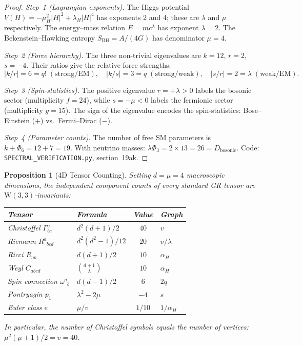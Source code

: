 \documentclass[12pt,a4paper]{article}
\newtheorem{proposition}[theorem]{Proposition}
\newcommand{\W}{\mathrm{W}(3,3)}
\begin{document}
\begin{proof}
\emph{Step~1 (Lagrangian exponents).}
The Higgs potential $V(H) = -\mu_H^2|H|^2 + \lambda_H|H|^4$
has exponents 2 and 4; these are $\lambda$ and $\mu$
respectively. The energy--mass relation $E = mc^\lambda$ has
exponent $\lambda = 2$. The Bekenstein--Hawking entropy
$S_{\mathrm{BH}} = A/(4G)$ has denominator $\mu = 4$.

\emph{Step~2 (Force hierarchy).}
The three non-trivial eigenvalues are $k = 12$, $r = 2$, $s = -4$.
Their ratios give the relative force strengths:
\[
  |k/r| = 6 = q! \;(\text{strong/EM}), \quad
  |k/s| = 3 = q  \;(\text{strong/weak}), \quad
  |s/r| = 2 = \lambda \;(\text{weak/EM}).
\]

\emph{Step~3 (Spin-statistics).}
The positive eigenvalue $r = +\lambda > 0$ labels the bosonic
sector (multiplicity $f = 24$), while $s = -\mu < 0$ labels
the fermionic sector (multiplicity $g = 15$).
The sign of the eigenvalue encodes the spin-statistics:
Bose--Einstein ($+$) vs.\ Fermi--Dirac ($-$).

\emph{Step~4 (Parameter counts).}
The number of free SM parameters is $k + \Phi_6 = 12 + 7 = 19$.
With neutrino masses: $\lambda\Phi_3 = 2 \times 13 = 26 = D_{\mathrm{bosonic}}$.
Code: \texttt{SPECTRAL\_VERIFICATION.py}, section~19ak.
\end{proof}


\begin{proposition}[4D Tensor Counting]\label{prop:tensor-count}
Setting $d = \mu = 4$ macroscopic dimensions, the independent
component counts of every standard GR tensor are $\W$-invariants:
\begin{center}
\begin{tabular}{llcl}
\toprule
\textbf{Tensor} & \textbf{Formula} & \textbf{Value} & \textbf{Graph} \\
\midrule
Christoffel $\Gamma^a_{bc}$ & $d^2(d+1)/2$ & $40$ & $v$ \\
Riemann $R^a_{\phantom{a}bcd}$ & $d^2(d^2{-}1)/12$ & $20$ & $v/\lambda$ \\
Ricci $R_{ab}$ & $d(d+1)/2$ & $10$ & $\alpha_H$ \\
Weyl $C_{abcd}$ & $\binom{d+1}{\lambda}$ & $10$ & $\alpha_H$ \\
Spin connection $\omega^a_{\phantom{a}b}$ & $d(d{-}1)/2$ & $6$ & $2q$ \\
Pontryagin $p_1$ & $\lambda^2 - 2\mu$ & $-4$ & $s$ \\
Euler class $e$ & $\mu/v$ & $1/10$ & $1/\alpha_H$ \\
\bottomrule
\end{tabular}
\end{center}
In particular, the number of Christoffel symbols equals the number
of vertices: $\mu^2(\mu+1)/2 = v = 40$.
\end{proposition}
\end{document}
